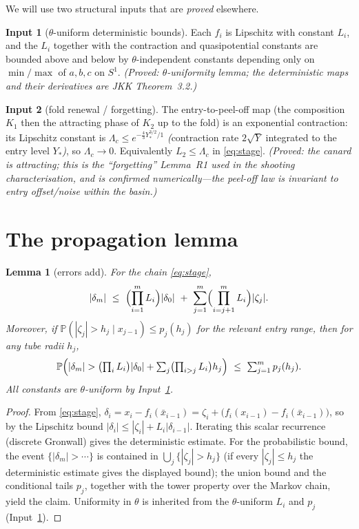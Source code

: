 \documentclass[11pt]{article}
\newtheorem{lemma}{Lemma}
\theoremstyle{definition}
\newtheorem{hyp}{Input}
\theoremstyle{remark}
\newcommand{\Pp}{\mathbb P}
\begin{document}
We will use two structural inputs that are \emph{proved} elsewhere.

\begin{hyp}[$\theta$-uniform deterministic bounds]\label{in:det}
Each $f_i$ is Lipschitz with constant $L_i$, and the $L_i$ together with the contraction
and quasipotential constants are bounded above and below by $\theta$-independent
constants depending only on $\min/\max$ of $a,b,c$ on $S^1$. \emph{(Proved:
$\theta$-uniformity lemma; the deterministic maps and their derivatives are JKK
Theorem~3.2.)}
\end{hyp}

\begin{hyp}[fold renewal / forgetting]\label{in:forget}
The entry-to-peel-off map (the composition $K_1$ then the attracting phase of $K_2$ up to
the fold) is an exponential contraction: its Lipschitz constant is
$\Lambda_c\le e^{-\frac43 Y_*^{3/2}/1}$ \emph{(}contraction rate $2\sqrt{Y}$ integrated to
the entry level $Y_*$\emph{)}, so $\Lambda_c\to0$. Equivalently $L_2\le\Lambda_c$ in
\eqref{eq:stage}. \emph{(Proved: the canard is attracting; this is the ``forgetting''
Lemma~R1 used in the shooting characterisation, and is confirmed numerically---the
peel-off law is invariant to entry offset/noise within the basin.)}
\end{hyp}

\section{The propagation lemma}

\begin{lemma}[errors add]\label{lem:prop}
For the chain \eqref{eq:stage},
\[
  |\delta_m|\ \le\ \Bigl(\prod_{i=1}^m L_i\Bigr)|\delta_0|
              \ +\ \sum_{j=1}^m\Bigl(\prod_{i=j+1}^m L_i\Bigr)|\zeta_j|.
\]
Moreover, if $\Pp(|\zeta_j|>h_j\mid x_{j-1})\le p_j(h_j)$ for the relevant entry range,
then for any tube radii $h_j$,
\[
  \Pp\Bigl(|\delta_m|>\textstyle\bigl(\prod_i L_i\bigr)|\delta_0|+\sum_j\bigl(\prod_{i>j}L_i\bigr)h_j\Bigr)
  \ \le\ \sum_{j=1}^m p_j(h_j).
\]
All constants are $\theta$-uniform by Input~\ref{in:det}.
\end{lemma}

\begin{proof}
From \eqref{eq:stage}, $\delta_i=x_i-f_i(\bar x_{i-1})
=\zeta_i+\bigl(f_i(x_{i-1})-f_i(\bar x_{i-1})\bigr)$, so by the Lipschitz bound
$|\delta_i|\le|\zeta_i|+L_i|\delta_{i-1}|$. Iterating this scalar recurrence (discrete
Gronwall) gives the deterministic estimate. For the probabilistic bound, the event
$\{|\delta_m|>\cdots\}$ is contained in $\bigcup_j\{|\zeta_j|>h_j\}$ (if every
$|\zeta_j|\le h_j$ the deterministic estimate gives the displayed bound); the union bound
and the conditional tails $p_j$, together with the tower property over the Markov chain,
yield the claim. Uniformity in $\theta$ is inherited from the $\theta$-uniform $L_i$ and
$p_j$ (Input~\ref{in:det}).
\end{proof}
\end{document}
